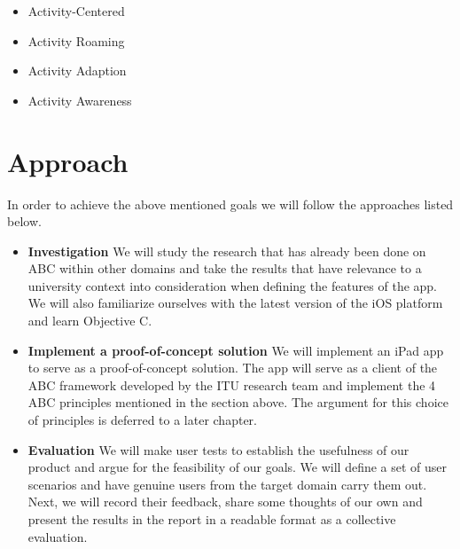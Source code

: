 \begin{itemize}
  \item Activity-Centered
  \item Activity Roaming
  \item Activity Adaption
  \item Activity Awareness
\end{itemize}

\section{Approach}
In order to achieve the above mentioned goals we will follow the approaches listed below.

\begin{itemize}
  \item \textbf{Investigation} \newline
        We will study the research that has already been done on ABC within other domains and take the results that have relevance to a university context into consideration when defining the features of the app. We will also familiarize ourselves with the latest version of the iOS platform and learn Objective C.
  \item \textbf{Implement a proof-of-concept solution} \newline
        We will implement an iPad app to serve as a proof-of-concept solution. The app will serve as a client of the ABC framework developed by the ITU research team and implement the 4 ABC principles mentioned in the section above. The argument for this choice of principles is deferred to a later chapter.
  \item \textbf{Evaluation} \newline
        We will make user tests to establish the usefulness of our product and argue for the feasibility of our goals. We will define a set of user scenarios and have genuine users from the target domain carry them out. Next, we will record their feedback, share some thoughts of our own and present the results in the report in a readable format as a collective evaluation.
\end{itemize}

\newpage

